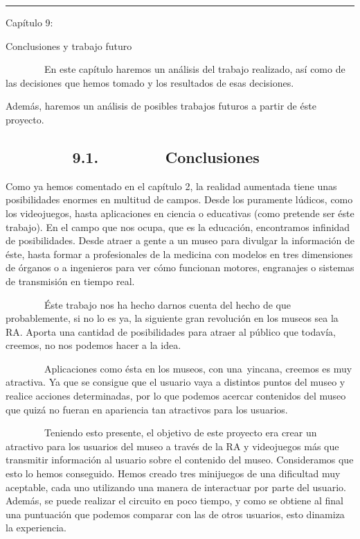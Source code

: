 \documentclass[]{article}
\begin{document}
\begin{center}\rule{3in}{0.4pt}\end{center}

Capítulo 9:

Conclusiones y trabajo futuro

~~~~~~~~En este capítulo haremos un análisis del trabajo realizado, así
como de las decisiones que hemos tomado y los resultados de esas
decisiones.

Además, haremos un análisis de posibles trabajos futuros a partir de
éste proyecto.

\subsection{~~~~~~~~9.1.~~~~~~~~Conclusiones}

Como ya hemos comentado en el capítulo 2, la realidad aumentada tiene
unas posibilidades enormes en multitud de campos. Desde los puramente
lúdicos, como los videojuegos, hasta aplicaciones en ciencia o
educativas (como pretende ser éste trabajo). En el campo que nos ocupa,
que es la educación, encontramos infinidad de posibilidades. Desde
atraer a gente a un museo para divulgar la información de éste, hasta
formar a profesionales de la medicina con modelos en tres dimensiones de
órganos o a ingenieros para ver cómo funcionan motores, engranajes o
sistemas de transmisión en tiempo real.

~~~~~~~~Éste trabajo nos ha hecho darnos cuenta del hecho de que
probablemente, si no lo es ya, la siguiente gran revolución en los
museos sea la RA. Aporta una cantidad de posibilidades para atraer al
público que todavía, creemos, no nos podemos hacer a la idea.

~~~~~~~~Aplicaciones como ésta en los museos, con una~yincana, creemos
es muy atractiva. Ya que se consigue que el usuario vaya a distintos
puntos del museo y realice acciones determinadas, por lo que podemos
acercar contenidos del museo que quizá no fueran en apariencia tan
atractivos para los usuarios.

~~~~~~~~Teniendo esto presente, el objetivo de este proyecto era crear
un atractivo para los usuarios del museo a través de la RA y videojuegos
más que transmitir información al usuario sobre el contenido del museo.
Consideramos que esto lo hemos conseguido. Hemos creado tres minijuegos
de una dificultad muy aceptable, cada uno utilizando una manera de
interactuar por parte del usuario. Además, se puede realizar el circuito
en poco tiempo, y como se obtiene al final una puntuación que podemos
comparar con las de otros usuarios, esto dinamiza la experiencia.
\end{document}
